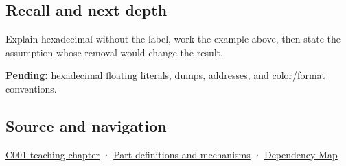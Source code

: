 \subsection{Recall and next depth}\label{appendix-6b8075763724-recall-and-next-depth}

Explain hexadecimal without the label, work the example above, then state the assumption whose removal would change the result.

\textbf{Pending:} hexadecimal floating literals, dumps, addresses, and color/format conventions.

\subsection{Source and navigation}\label{appendix-6b8075763724-source-and-navigation}

\hyperref[01-foundations-i-ch001-from-a-signal-to-an-interpretation]{C001 teaching chapter} · \hyperref[appendix-fd090d982a15]{Part definitions and mechanisms} · \hyperref[appendix-4ad47bdd269a]{Dependency Map}
